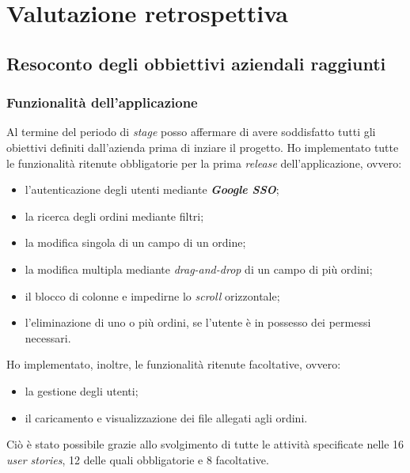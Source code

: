 
\chapter{Valutazione retrospettiva}
\label{cap:valutazione}
\section{Resoconto degli obbiettivi aziendali raggiunti}

\subsection{Funzionalità dell'applicazione}
Al termine del periodo di \emph{stage} posso affermare di avere soddisfatto tutti gli obiettivi definiti dall'azienda prima di inziare il progetto.
Ho implementato tutte le funzionalità ritenute obbligatorie per la prima \emph{release} dell'applicazione, ovvero:
\begin{itemize}
  \item l'autenticazione degli utenti mediante \emph{\textbf{Google SSO}};
  \item la ricerca degli ordini mediante filtri;
  \item la modifica singola di un campo di un ordine;
  \item la modifica multipla mediante \emph{drag-and-drop} di un campo di più ordini;
  \item il blocco di colonne e impedirne lo \emph{scroll} orizzontale;
  \item l'eliminazione di uno o più ordini, se l'utente è in possesso dei permessi necessari.
\end{itemize}

Ho implementato, inoltre, le funzionalità ritenute facoltative, ovvero:
\begin{itemize}
  \item la gestione degli utenti;
  \item il caricamento e visualizzazione dei file allegati agli ordini.
\end{itemize}

Ciò è stato possibile grazie allo svolgimento di tutte le attività specificate nelle 16 \emph{user stories}, 12 delle quali obbligatorie e 8 facoltative. 

